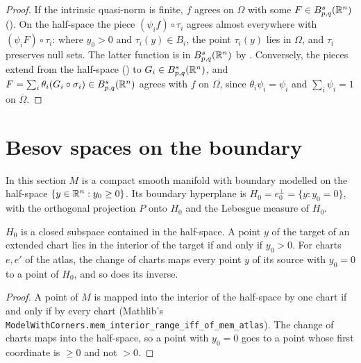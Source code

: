 \begin{proof}
\leanok
If the intrinsic quasi-norm is finite, $f$ agrees on $\Omega$ with some $F \in B^{s}_{p,q}(\mathbb{R}^n)$
(). On the half-space the piece $(\psi_i f) \circ \tau_i$ agrees
almost everywhere with $(\psi_i F) \circ \tau_i$: where $y_0 > 0$ and $\tau_i(y) \in B_i$, the
point $\tau_i(y)$ lies in $\Omega$, and $\tau_i$ preserves null sets. The latter function is in
$B^{s}_{p,q}(\mathbb{R}^n)$ by . Conversely, the pieces extend from the
half-space () to $G_i \in B^{s}_{p,q}(\mathbb{R}^n)$, and
$F = \sum_i \theta_i (G_i \circ \sigma_i) \in B^{s}_{p,q}(\mathbb{R}^n)$ agrees with $f$ on $\Omega$,
since $\theta_i \psi_i = \psi_i$ and $\sum_i \psi_i = 1$ on $\overline{\Omega}$.
\end{proof}

\section{Besov spaces on the boundary}
\label{sec:manifold-boundary-besov}

In this section $M$ is a compact smooth manifold with boundary modelled on the half-space
$\{y \in \mathbb{R}^n : y_0 \geq 0\}$. Its boundary hyperplane is $H_0 = e_0^\perp = \{y : y_0 = 0\}$, with
the orthogonal projection $P$ onto $H_0$ and the Lebesgue measure of $H_0$.

\begin{lemma}
\label{lem:coord-change-boundary}
\leanok
{}
$H_0$ is a closed subspace contained in the half-space. A point $y$ of the target of an extended
chart lies in the interior of the target if and only if $y_0 > 0$. For charts $e, e'$ of the
atlas, the change of charts maps every point $y$ of its source with $y_0 = 0$ to a point of $H_0$,
and so does its inverse.
\end{lemma}

\begin{proof}
\leanok
A point of $M$ is mapped into the interior of the half-space by one chart if and only if by every
chart (Mathlib's \texttt{ModelWithCorners.\allowbreak mem\_interior\_range\_iff\_of\_mem\_atlas}).
The change of charts maps into the half-space, so a point with $y_0 = 0$ goes to a point whose
first coordinate is $\geq 0$ and not $> 0$.
\end{proof}

